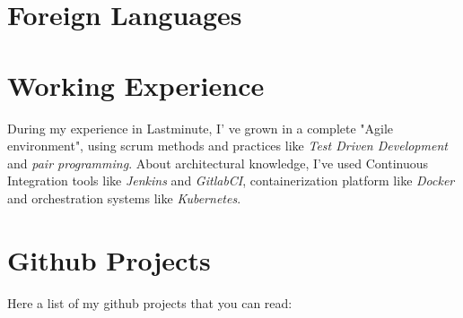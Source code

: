 \documentclass[letterpaper]{twentysecondcv} %
\begin{document}
\section{Foreign Languages}

\begin{twenty}
\end{twenty}


\section{Working Experience}

\begin{twenty}
\end{twenty}

During my experience in Lastminute, I' ve grown in a complete "Agile environment", using scrum methods and practices like \emph{Test Driven Development} and 
\emph{pair programming}. About architectural knowledge, I've used Continuous Integration tools like \emph{Jenkins} and \emph{GitlabCI}, containerization platform like  \emph{Docker} and orchestration systems like \emph{Kubernetes}.\newline

\section{Github Projects}
\newline\newline
Here a list of my github projects that you can read:
\end{document}
